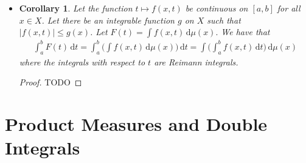 \documentclass[10pt]{article}
\newtheorem{corollary}[lemma]{Corollary}
\newcommand{\dee}{\mathrm{d}}
\begin{document}
\begin{itemize}
  \begin{proof}
    TODO
  \end{proof}

  \item \begin{corollary}
    Let the function $t \mapsto f(x,t)$ be continuous on $[a,b]$ for all $x \in X$. Let there be an integrable function $g$ on $X$ such that $|f(x,t)| \leq g(x)$. Let $F(t) = \int f(x,t)\, \dee\mu(x).$ We have that
    \begin{align*}
      \int_a^b F(t)\, \dee t 
      = \int_a^b \bigg( \int f(x,t)\, \dee\mu(x) \bigg)\, \dee t
      = \int \bigg( \int_a^b f(x,t)\, \dee t \bigg)\, \dee\mu(x)
    \end{align*}
    where the integrals with respect to $t$ are Reimann integrals.
  \end{corollary}

  \begin{proof}
    TODO
  \end{proof}
\end{itemize}

\section{Product Measures and Double Integrals}
\end{document}
